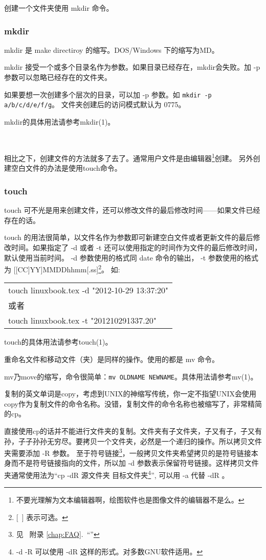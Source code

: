 \documentclass[amstex,twoside]{ctexbook}
\newenvironment{code}{\small\tt\begin{longtable}{p{0.8\textwidth}}}{\end{longtable}}
\newcommand{\faqref}[1]{~附录 \ref{chap:FAQ}.\nameref{chap:FAQ}~“\nameref{#1}”}
\begin{document}
创建一个文件夹使用 mkdir 命令。

\subsubsection*{mkdir}

mkdir 是 make directiroy 的缩写。DOS/Windows 下的缩写为MD。

mkdir 接受一个或多个目录名作为参数。如果目录已经存在，mkdir会失败。加 -p 参数可以忽略已经存在的文件夹。

如果要想一次创建多个层次的目录，可以加 -p 参数。如 \texttt{mkdir -p a/b/c/d/e/f/g}。
文件夹创建后的访问模式默认为 0775。

mkdir的具体用法请参考mkdir(1)。


~ \newline

相比之下，创建文件的方法就多了去了。通常用户文件是由编辑器\footnote{不要光理解为文本编辑器啊，绘图软件也是图像文件的编辑器不是么。}创建。
另外创建空白文件的办法是使用touch命令。

\subsubsection*{touch}

touch 可不光是用来创建文件，还可以修改文件的最后修改时间——如果文件已经存在的话。

touch 的用法很简单，以文件名作为参数即可新建空白文件或者更新文件的最后修改时间。如果指定了 -d 或者 -t 还可以使用指定的时间作为文件的最后修改时间，默认使用当前时间。
-d 参数使用的格式同 date 命令的输出， -t 参数使用的格式为 [[CC]YY]MMDDhhmm[.ss]\footnote{[~] 表示可选。}。 
如:

\begin{code}
\noindent touch linuxbook.tex -d "2012-10-29 13:37:20"\\
\indent \quad 或者 \\
\noindent touch linuxbook.tex -t "201210291337.20"
\end{code}
touch的具体用法请参考touch(1)。


重命名文件和移动文件（夹）是同样的操作。使用的都是 mv 命令。

mv乃move的缩写，命令很简单：\texttt{mv OLDNAME NEWNAME}。具体用法请参考mv(1)。

复制的英文单词是copy，考虑到UNIX的神缩写传统，你一定不指望UNIX会使用copy作为复制文件的命令名称。没错，复制文件的命令名称也被缩写了，非常精简的cp。

直接使用cp的话并不能进行文件夹的复制。文件夹有子文件夹，子又有子，子又有孙，子子孙孙无穷尽。要拷贝一个文件夹，必然是一个递归的操作。所以拷贝文件夹需要添加 -R 参数。
至于符号链接\footnote{见 \faqref{faq:symlink}}，一般拷贝文件夹希望拷贝的是符号链接本身而不是符号链接指向的文件，所以加 -d 参数表示保留符号链接。这样拷贝文件夹通常使用法为“cp -dR 源文件夹 目标文件夹\footnote{-d -R 可以使用 -dR 这样的形式。对多数GNU软件适用。}”, 可以用 -a 代替 -dR 。
\end{document}
